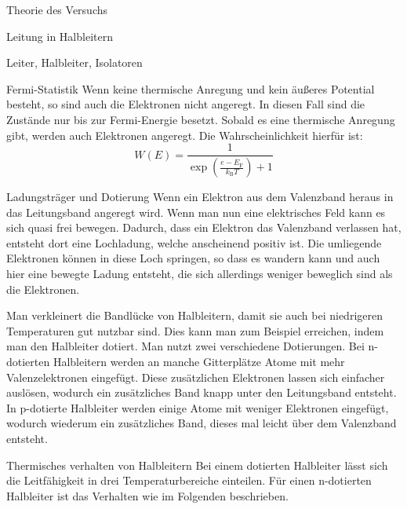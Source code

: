 \documentclass[pdftex, a4paper,11pt, twoside, ngerman]{report}
\begin{document}
\begin{chapter}{Theorie des Versuchs}
\begin{section}{Leitung in Halbleitern}
\begin{subsection}{Leiter, Halbleiter, Isolatoren}
        \end{subsection}

        \begin{subsection}{Fermi-Statistik}
            Wenn keine thermische Anregung und kein äußeres Potential besteht, so sind auch die Elektronen nicht angeregt.
            In diesen Fall sind die Zustände nur bis zur Fermi-Energie besetzt.
            Sobald es eine thermische Anregung gibt, werden auch Elektronen angeregt. Die Wahrscheinlichkeit hierfür ist:
            \[
                W(E) = \frac{1}{\exp({\frac{e-E_\text{F}}{k_\text{B}T}})+1}
            \]

        \end{subsection}

        \begin{subsection}{Ladungsträger und Dotierung}
            Wenn ein Elektron aus dem Valenzband heraus in das Leitungsband angeregt wird.
            Wenn man nun eine elektrisches Feld kann es sich quasi frei bewegen.
            Dadurch, dass ein Elektron das Valenzband verlassen hat, entsteht dort eine Lochladung, welche anscheinend positiv ist. 
            Die umliegende Elektronen können in diese Loch springen, so dass es wandern kann und auch hier eine bewegte Ladung entsteht, die sich allerdings weniger beweglich sind als die Elektronen.

            Man verkleinert die Bandlücke von Halbleitern, damit sie auch bei niedrigeren Temperaturen gut nutzbar sind.
            Dies kann man zum Beispiel erreichen, indem man den Halbleiter dotiert.
            Man nutzt zwei verschiedene Dotierungen. 
            Bei n-dotierten Halbleitern werden an manche Gitterplätze Atome mit mehr Valenzelektronen eingefügt.
            Diese zusätzlichen Elektronen lassen sich einfacher auslösen, wodurch ein zusätzliches Band knapp unter den Leitungsband entsteht.
            In p-dotierte Halbleiter werden einige Atome mit weniger Elektronen eingefügt, wodurch wiederum ein zusätzliches Band, dieses mal leicht über dem Valenzband entsteht.

        \end{subsection}

        \begin{subsection}{Thermisches verhalten von Halbleitern}
            Bei einem dotierten Halbleiter lässt sich die Leitfähigkeit in drei Temperaturbereiche einteilen.
            Für einen n-dotierten Halbleiter ist das Verhalten wie im Folgenden beschrieben.
            

\end{subsection}
\end{section}
\end{chapter}
\end{document}

